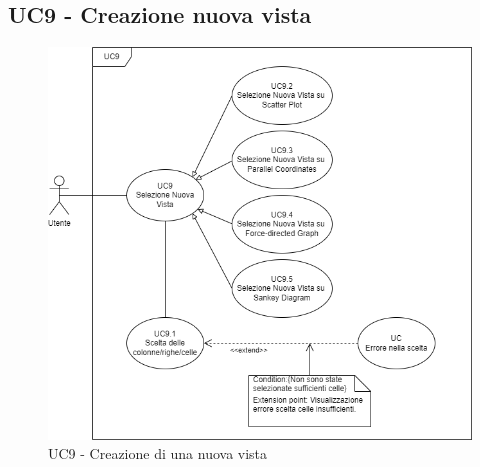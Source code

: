 \newpage

\subsection{UC9 - Creazione nuova vista}
\label{sec:UC9}
\begin{figure}[h!]
    \centering
    \includegraphics[scale=0.55]{../../assets/creazione_vista.png}
    \caption{UC9 - Creazione di una nuova vista}
\end{figure}

